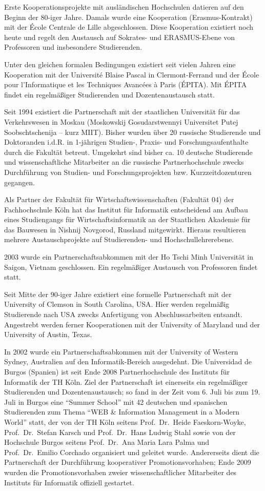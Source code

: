 Erste Kooperationsprojekte mit ausländischen Hochschulen datieren auf
den Beginn der 80-iger Jahre. Damals wurde eine Kooperation
(Erasmus-Kontrakt) mit der École Centrale de Lille abgeschlossen. Diese
Kooperation existiert noch heute und regelt den Austausch auf Sokrates-
und ERASMUS-Ebene von Professoren und insbesondere Studierenden.

Unter den gleichen formalen Bedingungen existiert seit vielen Jahren
eine Kooperation mit der Université Blaise Pascal in Clermont-Ferrand
und der École pour l'Informatique et les Techniques Avancées à Paris
(ÉPITA). Mit ÉPITA findet ein regelmäßiger Studierenden und
Dozentenaustausch statt.

Seit 1994 existiert die Partnerschaft mit der staatlichen Universität
für das Verkehrswesen in Moskau (Moskowskij Gosudarstwennyi Universitet
Putej Soobschtschenija -- kurz MIIT). Bisher wurden über 20 russische
Studierende und Doktoranden i.d.R. in 1-jährigen Studien-, Praxis- und
Forschungsaufenthalte durch die Fakultät betreut. Umgekehrt sind bisher
ca. 10 deutsche Studierende und wissenschaftliche Mitarbeiter an die
russische Partnerhochschule zwecks Durchführung von Studien- und
Forschungsprojekten bzw. Kurzzeitdozenturen gegangen.

Als Partner der Fakultät für Wirtschaftswissenschaften (Fakultät 04) der
Fachhochschule Köln hat das Institut für Informatik entscheidend am
Aufbau eines Studiengangs für Wirtschaftsinformatik an der Staatlichen
Akademie für das Bauwesen in Nishnij Novgorod, Russland mitgewirkt.
Hieraus resultieren mehrere Austauschprojekte auf Studierenden- und
Hochschullehrerebene.

2003 wurde ein Partnerschaftsabkommen mit der Ho Tschi Minh Universität
in Saigon, Vietnam geschlossen. Ein regelmäßiger Austausch von
Professoren findet statt.

Seit Mitte der 90-iger Jahre existiert eine formelle Partnerschaft mit
der University of Clemson in South Carolina, USA. Hier werden regelmäßig
Studierende nach USA zwecks Anfertigung von Abschlussarbeiten entsandt.
Angestrebt werden ferner Kooperationen mit der University of Maryland
und der University of Austin, Texas.

In 2002 wurde ein Partnerschaftsabkommen mit der University of Western
Sydney, Australien auf den Informatik-Bereich ausgedehnt. Die
Universidad de Burgos (Spanien) ist seit Ende 2008 Partnerhochschule des
Instituts für Informatik der TH Köln. Ziel der Partnerschaft ist
einerseits ein regelmäßiger Studierenden und Dozentenaustausch; so fand
in der Zeit vom 6. Juli bis zum 19. Juli in Burgos eine ``Summer
School'' mit 42 deutschen und spanischen Studierenden zum Thema ``WEB \&
Information Management in a Modern World'' statt, der von der TH Köln
seitens Prof.~Dr.~Heide Faeskorn-Woyke, Prof.~Dr.~Stefan Karsch und
Prof.~Dr.~Hans Ludwig Stahl sowie von der Hochschule Burgos seitens
Prof.~Dr.~Ana Maria Lara Palma und Prof.~Dr.~Emilio Corchado organisiert
und geleitet wurde. Andererseits dient die Partnerschaft der
Durchführung kooperativer Promotionsvorhaben; Ende 2009 wurden die
Promotionsvorhaben zweier wissenschaftlicher Mitarbeiter des Instituts
für Informatik offiziell gestartet.

